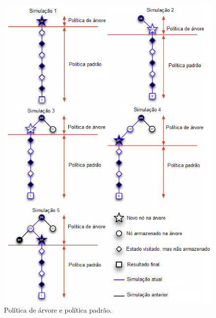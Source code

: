 \begin{figure}[p]
\centering
\includegraphics[width=16cm]{figures/politicasMCTS.png}
\caption[Políticas MCTS]{Política de árvore e política padrão.}
\label{fig:treePolicy}
\end{figure}